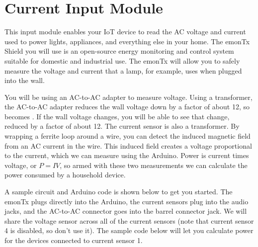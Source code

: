 
\clearpage
\section{Current Input Module}
\label{sec-input-power}

This input module enables your IoT device to read the AC voltage and current
used to power lights, appliances, and everything else in your home. The emonTx
Shield you will use is an open-source energy monitoring and control
system suitable for domestic and industrial use. The emonTx will allow you to safely
measure the voltage and current that a lamp, for example, uses when plugged into
the wall.

You will be using an AC-to-AC adapter to measure voltage. Using a
transformer, the AC-to-AC adapter reduces the wall voltage down by a
factor of about 12, so  becomes . If the wall
voltage changes, you will be able to see that change, reduced by a
factor of about 12. The current sensor is also a transformer. By
wrapping a ferrite loop around a wire, you can detect the induced
magnetic field from an AC current in the wire. This induced field
creates a voltage proportional to the current, which we can measure
using the Arduino. Power is current times voltage, or $P=IV$, so armed
with these two measurements we can calculate the power consumed by a
household device.

A sample circuit and Arduino code is shown below to get you started.
The emonTx plugs directly into the Arduino, the current sensors plug
into the  audio jacks, and the AC-to-AC connector goes into
the barrel connector jack. We will share the voltage sensor across all
of the current sensors (note that current sensor 4 is disabled, so don't
use it). The sample code below will let you calculate power for the
devices connected to current sensor 1.

